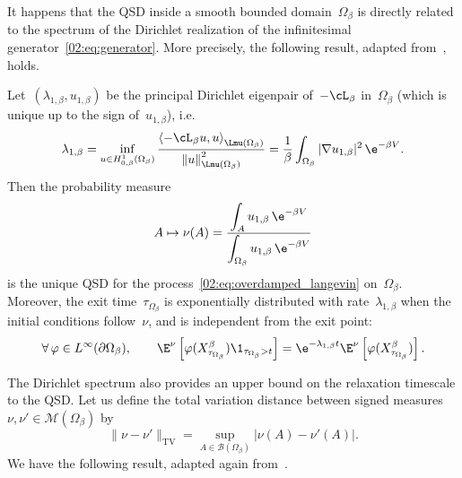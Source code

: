     It happens that the QSD inside a smooth bounded domain~$\Omega_\beta$ is directly related to the spectrum of the Dirichlet realization of the infinitesimal generator~\eqref{02:eq:generator}.
    More precisely, the following result, adapted from~\cite{LBLLP12}, holds.
    \begin{proposition}
        \label{02:prop:qsd_spectral}
        Let~$(\lambda_{1,\beta},u_{1,\beta})$ be the principal Dirichlet eigenpair of~$-\cL_\beta$ in~$\Omega_\beta$ (which is unique up to the sign of~$u_{1,\beta}$), i.e.
        \begin{equation}
            \lambda_{1,\beta} = \underset{u\in H_{0,\beta}^1(\Omega_\beta)}{\inf}\,\frac{\left\langle-\cL_\beta u,u\right\rangle_{\Lmu(\Omega_\beta)}}{\left\|u\right\|^2_{\Lmu(\Omega_\beta)}} = \frac1\beta\int_{\Omega_\beta}|\nabla u_{1,\beta}|^2\,\e^{-\beta V}.
        \end{equation}
        Then the probability measure
        \begin{equation}
            \label{02:eq:qsd_spectral}
            A\mapsto\nu(A) = {\frac{\displaystyle\int_A u_{1,\beta}\,\e^{-\beta V}}{\displaystyle\int_{\Omega_\beta}u_{1,\beta}\,\e^{-\beta V}}}
        \end{equation}
        is the unique QSD for the process~\eqref{02:eq:overdamped_langevin} on~$\Omega_\beta$.
        Moreover, the exit time~$\tau_{\Omega_\beta}$ is exponentially distributed with rate~$\lambda_{1,\beta}$ when the initial conditions follow~$\nu$, and is independent from the exit point:
            \begin{equation}
            \forall\,\varphi\in L^\infty(\partial\Omega_\beta),\qquad\E^\nu\left[\varphi(X^\beta_{\tau_{\Omega_\beta}})\1_{\tau_{\Omega_\beta}>t}\right] = \e^{-\lambda_{1,\beta}t}\E^\nu\left[\varphi(X^\beta_{\tau_{\Omega_\beta}})\right].
        \end{equation}
        \end{proposition}
    The Dirichlet spectrum also provides an upper bound on the relaxation timescale to the QSD.
    Let us define the total variation distance between signed measures~$\nu,\nu'\in\mathcal M(\Omega_\beta)$ by
    \[\|\nu-\nu'\|_{\mathrm{TV}} = \underset{A\in\mathcal B(\Omega_\beta)}{\sup} |\nu(A)-\nu'(A)|.\]
    We have the following result, adapted again from~\cite{LBLLP12}.
